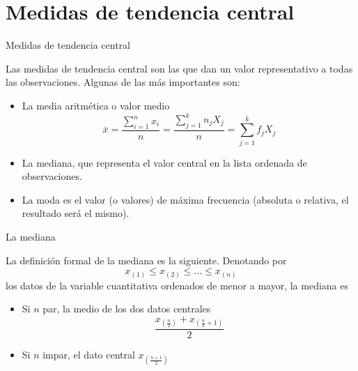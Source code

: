 \documentclass[
  ignorenonframetext,
]{beamer}
\providecommand{\tightlist}{%
  \setlength{\itemsep}{0pt}\setlength{\parskip}{0pt}}
\begin{document}
\hypertarget{medidas-de-tendencia-central}{%
\section{Medidas de tendencia
central}\label{medidas-de-tendencia-central}}

\begin{frame}{Medidas de tendencia central}
\protect\hypertarget{medidas-de-tendencia-central-1}{}

Las medidas de tendencia central son las que dan un valor representativo
a todas las observaciones. Algunas de las más importantes son:

\begin{itemize}
\tightlist
\item
  La media aritmética o valor medio
  \[\bar{x} = \frac{\sum_{i=1}^nx_i}{n}=\frac{\sum_{j=1}^kn_jX_j}{n}=\sum_{j=1}^kf_jX_j\]
\item
  La mediana, que representa el valor central en la lista ordenada de
  observaciones.
\item
  La moda es el valor (o valores) de máxima frecuencia (absoluta o
  relativa, el resultado será el mismo).
\end{itemize}

\end{frame}

\begin{frame}{La mediana}
\protect\hypertarget{la-mediana}{}

La definición formal de la mediana es la siguiente. Denotando por
\[x_{(1)}\le x_{(2)}\le\dots\le x_{(n)}\] los datos de la variable
cuantitativa ordenados de menor a mayor, la mediana es

\begin{itemize}
\tightlist
\item
  Si \(n\) par, la medio de los dos datos centrales
  \[\frac{x_{(\frac{n}{2})}+x_{(\frac{n}{2}+1)}}{2}\]
\item
  Si \(n\) impar, el dato central \(x_{(\frac{n+1}{2})}\)
\end{itemize}

\end{frame}
\end{document}
